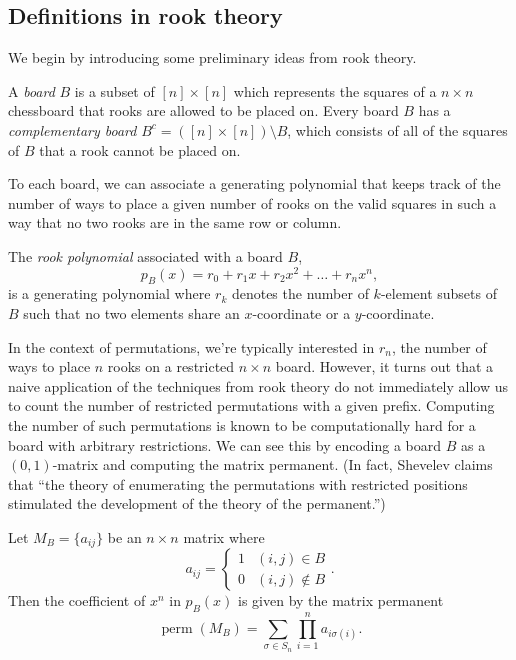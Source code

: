 

\subsection{Definitions in rook theory}
We begin by introducing some preliminary ideas from rook theory.

\begin{definition}
  A \textit{board} $B$ is a subset of $[n] \times [n]$ which represents the
  squares of a $n \times n$ chessboard that rooks are allowed to be placed on.
  Every board $B$ has a \textit{complementary board}
  $B^c = ([n] \times [n]) \setminus B$, which consists of all of the
  squares of $B$ that a rook cannot be placed on.
\end{definition}

To each board, we can associate a generating polynomial that keeps track of the
number of ways to place a given number of rooks on the valid squares in such a
way that no two rooks are in the same row or column.

\begin{definition}
  The \textit{rook polynomial} associated with a board $B$,
  \[
    p_B(x) = r_0 + r_1 x + r_2 x^2 + \dots + r_n x^n,
  \]
  is a generating polynomial where $r_k$ denotes the number of $k$-element subsets
  of $B$ such that no two elements share an $x$-coordinate or a $y$-coordinate.
\end{definition}

In the context of permutations, we're typically interested in $r_n$, the number
of ways to place $n$ rooks on a restricted $n \times n$ board.
However, it turns out that a naive application of the techniques from
rook theory do not immediately allow us to count the number of
restricted permutations with a given prefix.
Computing the number of such permutations is known to be computationally hard
for a board with arbitrary restrictions.
We can see this by encoding a board $B$ as a $(0,1)$-matrix and computing the matrix
permanent. (In fact, Shevelev \cite{Shevelev1992} claims that
``the theory of enumerating the permutations with restricted positions
stimulated the development of the theory of the permanent.'')

\begin{lemma}
  Let $M_B = \{a_{ij}\}$ be an $n \times n$ matrix where \[
    a_{ij} = \begin{cases}
      1 & (i,j) \in B \\
      0 & (i,j) \not\in B
    \end{cases}.
  \]
  Then the coefficient of $x^n$ in $p_B(x)$ is given by the matrix permanent
  \[
    \operatorname{perm}(M_B) = \sum_{\sigma \in S_n} \prod_{i=1}^n a_{i\sigma(i)}.
  \]
\end{lemma}

